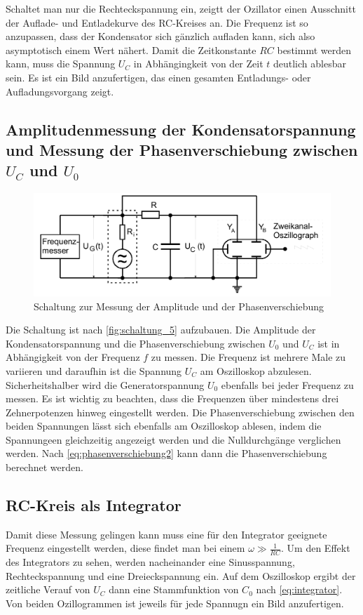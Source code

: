 Schaltet man nur die Rechteckspannung ein, zeigtt der Ozillator einen Ausschnitt der Auflade- und Entladekurve des RC-Kreises an. Die Frequenz ist so anzupassen, dass der Kondensator sich gänzlich aufladen kann, sich also asymptotisch einem Wert nähert. Damit die Zeitkonstante $RC$ bestimmt werden kann, muss die Spannung $U_C$ in Abhängingkeit von der Zeit $t$ deutlich ablesbar sein. Es ist ein Bild anzufertigen, das einen gesamten Entladungs- oder Aufladungsvorgang zeigt. 

\subsection{Amplitudenmessung der Kondensatorspannung und Messung der Phasenverschiebung zwischen $U_C$ und $U_0$}
\label{sec:Durchführung_2}

\begin{figure}
    \centering
    \includegraphics[width=\textwidth/2]{images/schaltung_5.png}
    \caption{Schaltung zur Messung der Amplitude und der Phasenverschiebung  \cite{V353}}
    \label{fig:schaltung_5}
\end{figure}

Die Schaltung ist nach \autoref{fig:schaltung_5} aufzubauen. Die Amplitude der Kondensatorspannung und die Phasenverschiebung zwischen $U_0$ und $U_C$ ist in Abhängigkeit von der Frequenz $f$ zu messen. Die Frequenz ist mehrere Male zu variieren und daraufhin ist die Spannung $U_C$ am Oszilloskop abzulesen. Sicherheitshalber wird die Generatorspannung $U_0$ ebenfalls bei jeder Frequenz zu messen. Es ist wichtig zu beachten, dass die Frequenzen über mindestens drei Zehnerpotenzen hinweg eingestellt werden. 
Die Phasenverschiebung zwischen den beiden Spannungen lässt sich ebenfalls am Oszilloskop ablesen, indem die Spannungeen gleichzeitig angezeigt werden und die Nulldurchgänge verglichen werden.
Nach \autoref{eq:phasenverschiebung2} kann dann die Phasenverschiebung berechnet werden. 

\subsection{RC-Kreis als Integrator}
\label{sec:Durchführung_3}

Damit diese Messung gelingen kann muss eine für den Integrator geeignete Frequenz eingestellt werden, diese findet man bei einem $\omega \gg \frac{1}{RC}$. Um den Effekt des Integrators zu sehen, werden nacheinander eine Sinusspannung, Rechteckspannung und eine Dreieckspannung ein. Auf dem Oszilloskop ergibt der zeitliche Verauf von $U_C$ dann eine Stammfunktion von $C_0$ nach \autoref{eq:integrator}. Von beiden Ozillogrammen ist jeweils für jede Spannugn ein Bild anzufertigen.

